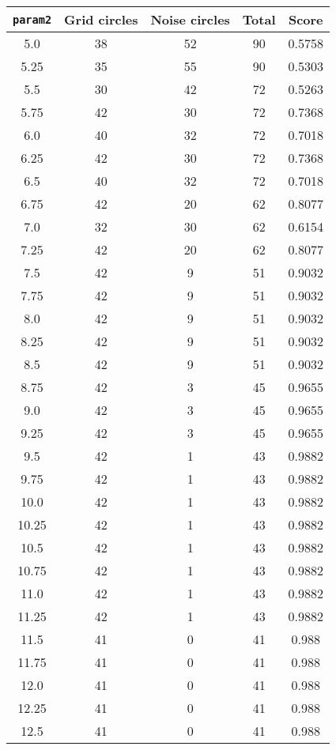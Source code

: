 \documentclass[letterpaper, 12pt]{article}
\begin{document}
\begin{longtable}{|c|c|c|c|c|}
\hline
\textbf{\texttt{param2}} & \textbf{Grid circles} & \textbf{Noise circles} & \textbf{Total} & \textbf{Score} \\
\hline
5.0 & 38 & 52 & 90 & 0.5758 \\
\hline
5.25 & 35 & 55 & 90 & 0.5303 \\
\hline
5.5 & 30 & 42 & 72 & 0.5263 \\
\hline
5.75 & 42 & 30 & 72 & 0.7368 \\
\hline
6.0 & 40 & 32 & 72 & 0.7018 \\
\hline
6.25 & 42 & 30 & 72 & 0.7368 \\
\hline
6.5 & 40 & 32 & 72 & 0.7018 \\
\hline
6.75 & 42 & 20 & 62 & 0.8077 \\
\hline
7.0 & 32 & 30 & 62 & 0.6154 \\
\hline
7.25 & 42 & 20 & 62 & 0.8077 \\
\hline
7.5 & 42 & 9 & 51 & 0.9032 \\
\hline
7.75 & 42 & 9 & 51 & 0.9032 \\
\hline
8.0 & 42 & 9 & 51 & 0.9032 \\
\hline
8.25 & 42 & 9 & 51 & 0.9032 \\
\hline
8.5 & 42 & 9 & 51 & 0.9032 \\
\hline
8.75 & 42 & 3 & 45 & 0.9655 \\
\hline
9.0 & 42 & 3 & 45 & 0.9655 \\
\hline
9.25 & 42 & 3 & 45 & 0.9655 \\
\hline
9.5 & 42 & 1 & 43 & 0.9882 \\
\hline
9.75 & 42 & 1 & 43 & 0.9882 \\
\hline
10.0 & 42 & 1 & 43 & 0.9882 \\
\hline
10.25 & 42 & 1 & 43 & 0.9882 \\
\hline
10.5 & 42 & 1 & 43 & 0.9882 \\
\hline
10.75 & 42 & 1 & 43 & 0.9882 \\
\hline
11.0 & 42 & 1 & 43 & 0.9882 \\
\hline
11.25 & 42 & 1 & 43 & 0.9882 \\
\hline
11.5 & 41 & 0 & 41 & 0.988 \\
\hline
11.75 & 41 & 0 & 41 & 0.988 \\
\hline
12.0 & 41 & 0 & 41 & 0.988 \\
\hline
12.25 & 41 & 0 & 41 & 0.988 \\
\hline
12.5 & 41 & 0 & 41 & 0.988 \\

\end{longtable}
\end{document}

